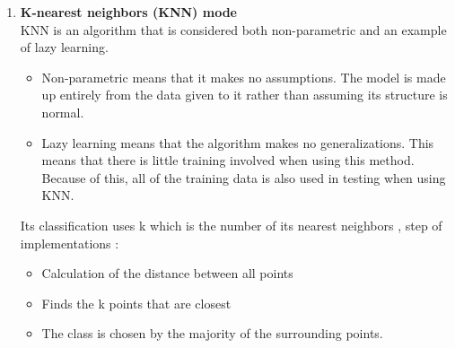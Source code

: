 \documentclass[a4paper, 11pt, oneside]{article} %
\begin{document}
\begin {enumerate}
\begin{enumerate}
\item We have expected that our hypothesis will give values between 0 and 1.
\begin{itemize}

\item $h{\theta(x)} = sigmoid(Z)$
\item $h{\theta(x)} = \frac {1}{1 + e ^- { (\beta_{0}+ \beta_{1}X)}}$
\end{itemize}
\end{enumerate}

 \textbf {Advantages of Logistic regression:  }   
\begin{enumerate}
\item Very efficient
\item Doesn’t require too many resources
\item Easy to regularize
\item Easy to implement
\end{enumerate}
\item \textbf { K-nearest neighbors (KNN) mode}  \\
KNN is an algorithm that is considered both non-parametric and an example of lazy learning.\cite{towardsdatascience2} 
\begin{itemize}
\item Non-parametric means that it makes no assumptions. The model is made up entirely from the data given to it rather than assuming its structure is normal.
\item Lazy learning means that the algorithm makes no generalizations. This means that there is little training involved when using this method. Because of this, all of the training data is also used in testing when using KNN.
\end{itemize}
 Its classification uses k which is the number of its nearest neighbors , step of implementations :
\begin{itemize}
\item Calculation of the distance between all points
\item Finds the k points that are closest
\item The class is chosen by the majority of the surrounding points.
\end{itemize}
\end{enumerate}
\end{document}
